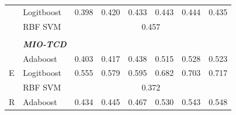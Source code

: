 \documentclass[12pt]{article}
\begin{document}
\begin{sloppypar}
\begin{table}
\begin{tabular}{lllllllll}
                                       & \multicolumn{2}{l}{Logitboost}                            & 0.398                           & 0.420                            & 0.433                            & 0.443                           & 0.444                            & 0.435                            \\
                                       & \multicolumn{2}{l}{RBF SVM}                               & \multicolumn{6}{c}{0.457}                                                                                                                                                                                     \\
                                       &                 &                                         &                                 &                                  &                                  &                                 &                                  &                                  \\
                                       & \multicolumn{2}{l}{\textit{\textbf{MIO-TCD}}}             &                                 &                                  &                                  &                                 &                                  &                                  \\
\multirow{3}{*}{E}                     & \multicolumn{2}{l}{Adaboost}                              & 0.403                           & 0.417                            & 0.438                            & 0.515                           & 0.528                            & 0.523                            \\
                                       & \multicolumn{2}{l}{Logitboost}                            & 0.555                           & 0.579                            & 0.595                            & 0.682                           & 0.703                            & 0.717                            \\
                                       & \multicolumn{2}{l}{RBF SVM}                               & \multicolumn{6}{c}{0.372}                                                                                                                                                                                     \\
\multirow{3}{*}{R}                     & \multicolumn{2}{l}{Adaboost}                              & 0.434                           & 0.445                            & 0.467                            & 0.530                           & 0.543                            & 0.548                            \\

\end{tabular}
\end{table}
\end{sloppypar}
\end{document}

